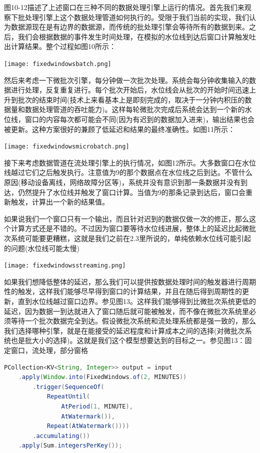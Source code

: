 \documentclass[oneside]{ctexbook}
\begin{document}
图10-12描述了上述窗口在三种不同的数据处理引擎上运行的情况。首先我们来观察下批处理引擎上这个数据处理管道如何执行的。受限于我们当前的实现，我们认为数据源现在是有边界的数据源，而传统的批处理引擎会等待所有的数据到来。之后，我们会根据数据的事件发生时间处理，在模拟的水位线到达后窗口计算触发吐出计算结果。整个过程如图10所示：

\noindent \texttt{[image: fixedwindowsbatch.png]}

然后来考虑一下微批次引擎，每分钟做一次批次处理。系统会每分钟收集输入的数据进行处理，反复重复进行。每个批次开始后，水位线会从批次的开始时间迅速上升到批次的结束时间(技术上来看基本上是即刻完成的，取决于一分钟内积压的数据量和数据处理管道的吞吐能力)。这样每轮微批次完成后系统会达到一个新的水位线，窗口的内容每次都可能会不同(因为有迟到的数据加入进来)，输出结果也会被更新。这种方案很好的兼顾了低延迟和结果的最终准确性。如图11所示：

\noindent \texttt{[image: fixedwindowsmicrobatch.png]}

接下来考虑数据管道在流处理引擎上的执行情况，如图12所示。大多数窗口在水位线越过它们之后触发执行。注意值为9的那个数据点在水位线之后到达。不管什么原因(移动设备离线，网络故障分区等)，系统并没有意识到那一条数据并没有到达，仍然提升了水位线并触发了窗口计算。当值为9的那条记录到达后，窗口会重新触发，计算出一个新的结果值。

如果说我们一个窗口只有一个输出，而且针对迟到的数据仅做一次的修正，那么这个计算方式还是不错的。不过因为窗口要等待水位线进展，整体上的延迟比起微批次系统可能要更糟糕，这就是我们之前在2.3里所说的，单纯依赖水位线可能引起的问题(水位线可能太慢)

\noindent \texttt{[image: fixedwindowsstreaming.png]}

如果我们想降低整体的延迟，那么我们可以提供按数据处理时间的触发器进行周期性的触发，这样我们能够尽早得到窗口的计算结果，并且在随后得到周期性的更新，直到水位线越过窗口边界。参见图13。这样我们能够得到比微批次系统更低的延迟，因为数据一到达就进入了窗口随后就可能被触发，而不像在微批次系统里必须等待一个批次数据完全到达。假设微批次系统和流处理系统都是强一致的，那么我们选择哪种引擎，就是在能接受的延迟程度和计算成本之间的选择(对微批次系统也是批大小的选择)。这就是我们这个模型想要达到的目标之一。参见图13：固定窗口，流处理，部分窗格

\begin{lstlisting}[language=java]
PCollection<KV<String, Integer>> output = input
    .apply(Window.into(FixedWindows.of(2, MINUTES))
        .trigger(SequenceOf(
            RepeatUntil(
                AtPeriod(1, MINUTE),
                AtWatermark()),
            Repeat(AtWatermark())))
        .accumulating())
    .apply(Sum.integersPerKey());
\end{lstlisting}
\end{document}
